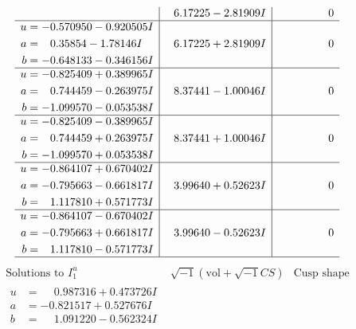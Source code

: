 \documentclass[1p]{elsarticle_modified}
\theoremstyle{definition}
\newcommand{\I}{\sqrt{-1}}
\begin{document}
$$\begin{array}{c|c|c}
 & \phantom{-}6.17225 - 2.81909 I & \phantom{-0.000000 } 0 \\ \hline\begin{aligned}
u &= -0.570950 - 0.920505 I \\
a &= \phantom{-}0.35854 - 1.78146 I \\
b &= -0.648133 - 0.346156 I\end{aligned}
 & \phantom{-}6.17225 + 2.81909 I & \phantom{-0.000000 } 0 \\ \hline\begin{aligned}
u &= -0.825409 + 0.389965 I \\
a &= \phantom{-}0.744459 - 0.263975 I \\
b &= -1.099570 - 0.053538 I\end{aligned}
 & \phantom{-}8.37441 - 1.00046 I & \phantom{-0.000000 } 0 \\ \hline\begin{aligned}
u &= -0.825409 - 0.389965 I \\
a &= \phantom{-}0.744459 + 0.263975 I \\
b &= -1.099570 + 0.053538 I\end{aligned}
 & \phantom{-}8.37441 + 1.00046 I & \phantom{-0.000000 } 0 \\ \hline\begin{aligned}
u &= -0.864107 + 0.670402 I \\
a &= -0.795663 - 0.661817 I \\
b &= \phantom{-}1.117810 + 0.571773 I\end{aligned}
 & \phantom{-}3.99640 + 0.52623 I & \phantom{-0.000000 } 0 \\ \hline\begin{aligned}
u &= -0.864107 - 0.670402 I \\
a &= -0.795663 + 0.661817 I \\
b &= \phantom{-}1.117810 - 0.571773 I\end{aligned}
 & \phantom{-}3.99640 - 0.52623 I & \phantom{-0.000000 } 0\\
 \hline 
 \end{array}$$\newpage$$\begin{array}{c|c|c}  
\text{Solutions to }I^u_{1}& \I (\text{vol} + \sqrt{-1}CS) & \text{Cusp shape}\\
 \hline 
\begin{aligned}
u &= \phantom{-}0.987316 + 0.473726 I \\
a &= -0.821517 + 0.527676 I \\
b &= \phantom{-}1.091220 - 0.562324 I\end{aligned}

\end{array}$$
\end{document}

